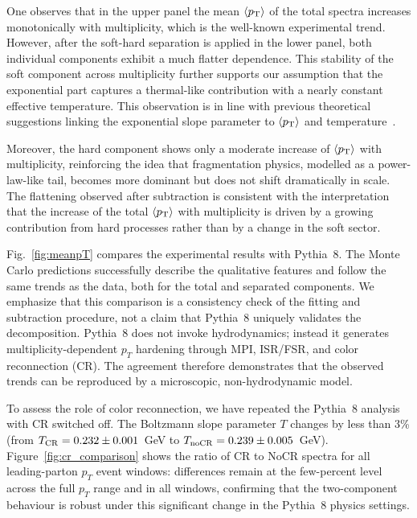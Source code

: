\documentclass[pdflatex,sn-mathphys-num]{sn-jnl}%
\begin{document}
One observes that in the upper panel the mean $\langle p_{\rm T} \rangle$ of the total spectra increases monotonically with multiplicity, which is the well-known experimental trend. However, after the soft-hard separation is applied in the lower panel, both individual components exhibit a much flatter dependence. This stability of the soft component across multiplicity further supports our assumption that the exponential part captures a thermal-like contribution with a nearly constant effective temperature. This observation is in line with previous theoretical suggestions linking the exponential slope parameter to $\langle p_{\rm T} \rangle$ and temperature~\cite{Gardim:2024zvi}.

Moreover, the hard component shows only a moderate increase of $\langle p_{\rm T} \rangle$ with multiplicity, reinforcing the idea that fragmentation physics, modelled as a power-law-like tail, becomes more dominant but does not shift dramatically in scale. The flattening observed after subtraction is consistent with the interpretation that the increase of the total $\langle p_{\rm T} \rangle$ with multiplicity is driven by a growing contribution from hard processes rather than by a change in the soft sector.

Fig.~\ref{fig:meanpT} compares the experimental results with {\sc Pythia}~8. The Monte Carlo predictions successfully describe the qualitative features and follow the same trends as the data, both for the total and separated components. We emphasize that this comparison is a consistency check of the fitting and subtraction procedure, not a claim that {\sc Pythia}~8 uniquely validates the decomposition. {\sc Pythia}~8 does not invoke hydrodynamics; instead it generates multiplicity-dependent $p_T$ hardening through MPI, ISR/FSR, and color reconnection (CR). The agreement therefore demonstrates that the observed trends can be reproduced by a microscopic, non-hydrodynamic model.

To assess the role of color reconnection, we have repeated the {\sc Pythia}~8 analysis with CR switched off. The Boltzmann slope parameter $T$ changes by less than 3\% (from $T_{\rm CR} = 0.232 \pm 0.001$~GeV to $T_{\rm noCR} = 0.239 \pm 0.005$~GeV). Figure~\ref{fig:cr_comparison} shows the ratio of CR to NoCR spectra for all leading-parton $p_T$ event windows: differences remain at the few-percent level across the full $p_T$ range and in all windows, confirming that the two-component behaviour is robust under this significant change in the {\sc Pythia}~8 physics settings.
\end{document}
